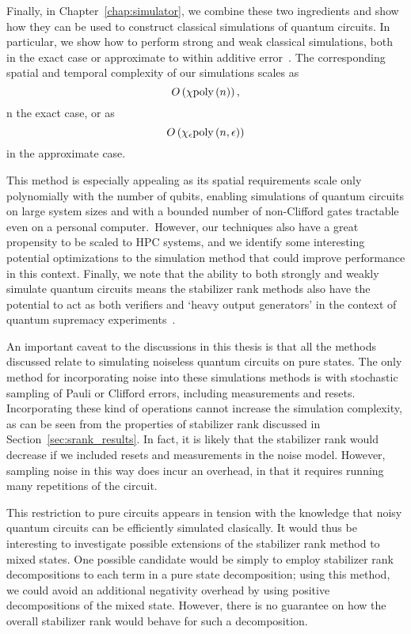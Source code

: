 Finally, in Chapter~\ref{chap:simulator}, we combine these two ingredients and show how they can be used to construct classical simulations of quantum circuits. In particular, we show how to perform strong and weak classical simulations, both in the exact case or approximate to within additive error~\cite{Bravyi2018}. The corresponding spatial and temporal complexity of our simulations scales as
\begin{equation}
O\left(\chi \text{poly}\left(n\right)\right),\label{eq:exact_complexity}
\end{equation} 
n the exact case, or as
\begin{equation}
O\left(\chi_{\epsilon}\text{poly}\left(n,\epsilon\right)\right)\label{eq:approximate_complexity}
\end{equation}in the approximate case.\par
This method is especially appealing as its spatial requirements scale only polynomially with the number of qubits, enabling simulations of quantum circuits on large system sizes and with a bounded number of non-Clifford gates tractable even on a personal computer.\ However, our techniques also have a great propensity to be scaled to HPC systems, and we identify some interesting potential optimizations to the simulation method that could improve performance in this context. Finally, we note that the ability to both strongly and weakly simulate quantum circuits means the stabilizer rank methods also have the potential to act as both verifiers and `heavy output generators' in the context of quantum supremacy experiments~\cite{Aaronson2016}.\par
An important caveat to the discussions in this thesis is that all the methods discussed relate to simulating noiseless quantum circuits on pure states. The only method for incorporating noise into these simulations methods is with stochastic sampling of Pauli or Clifford errors, including measurements and resets. Incorporating these kind of operations cannot increase the simulation complexity, as can be seen from the properties of stabilizer rank discussed in Section~\ref{sec:srank_results}. In fact, it is likely that the stabilizer rank would decrease if we included resets and measurements in the noise model. However, sampling noise in this way does incur an overhead, in that it requires running many repetitions of the circuit.\par
This restriction to pure circuits appears in tension with the knowledge that noisy quantum circuits can be efficiently simulated clasically. It would thus be interesting to investigate possible extensions of the stabilizer rank method to mixed states. One possible candidate would be simply to employ stabilizer rank decompositions to each term in a pure state decomposition; using this method, we could avoid an additional negativity overhead by using positive decompositions of the mixed state. However, there is no guarantee on how the overall stabilizer rank would behave for such a decomposition.\par
